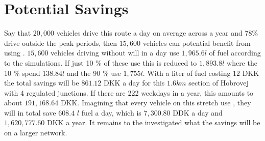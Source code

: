 \section{Potential Savings}%
Say that $20,000$ vehicles drive this route a day on average across a year and 78\% drive outside the peak periods, then $15,600$ vehicles can potential benefit from using \tech\cite{}.%
$15,600$ vehicles driving without \tech will in a day use $1,965.6 l$ of fuel according to the simulations.
If just 10 \% of these use \tech this is reduced to $1,893.8 l$ where the 10 \% spend $138.84 l$ and the 90 \% use $1,755 l$.
With a liter of fuel costing $12$ DKK the total savings will be $861.12$ DKK a day for this $1.6 km$ section of Hobrovej with 4 regulated junctions.
If there are 222 weekdays in a year, this amounts to about $191,168.64$ DKK.
Imagining that every vehicle on this stretch use \tech, they will in total save $608.4$ $l$ fuel a day, which is $7,300.80$ DDK a day and $1,620,777.60$ DKK a year.
It remains to the investigated what the savings will be on a larger network.





